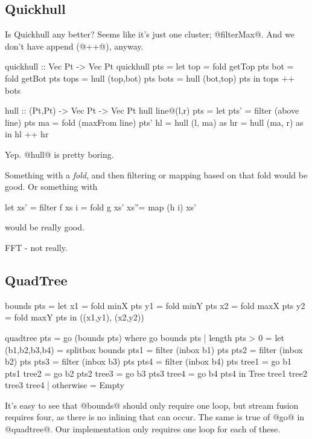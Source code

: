 \subsection{Quickhull}
Is Quickhull any better? Seems like it's just one cluster; @filterMax@. And we don't have append (@++@), anyway.
\begin{code}
quickhull :: Vec Pt -> Vec Pt
quickhull pts
 = let top  = fold getTop pts
       bot  = fold getBot pts
       tops = hull (top,bot) pts
       bots = hull (bot,top) pts
   in  tops ++ bots

hull :: (Pt,Pt) -> Vec Pt -> Vec Pt
hull line@(l,r) pts
 = let pts' = filter (above   line) pts
       ma   = fold   (maxFrom line) pts'
       hl   = hull   (l, ma)        as
       hr   = hull   (ma, r)        as
   in  hl  ++ hr
\end{code}
Yep. @hull@ is pretty boring.

Something with a \emph{fold}, and then filtering or mapping based on that fold would be good.
Or something with
\begin{code}
let xs' = filter f    xs
    i   = fold   g    xs'
    xs''= map   (h i) xs'
\end{code}
would be really good.

FFT - not really.

\subsection{QuadTree}
\begin{code}
bounds pts
 = let x1 = fold minX pts
       y1 = fold minY pts
       x2 = fold maxX pts
       y2 = fold maxY pts
   in ((x1,y1), (x2,y2))

%
quadtree pts
 = go (bounds pts)
 where
  go bounds pts
   | length pts > 0
   = let (b1,b2,b3,b4) = splitbox bounds
         pts1  = filter (inbox b1) pts
         pts2  = filter (inbox b2) pts
         pts3  = filter (inbox b3) pts
         pts4  = filter (inbox b4) pts
         tree1 = go b1 pts1
         tree2 = go b2 pts2
         tree3 = go b3 pts3
         tree4 = go b4 pts4
      in Tree tree1 tree2 tree3 tree4
   | otherwise
   = Empty
\end{code}
It's easy to see that @bounds@ should only require one loop, but stream fusion requires four, as there is no inlining that can occur.
The same is true of @go@ in @quadtree@. Our implementation only requires one loop for each of these.
